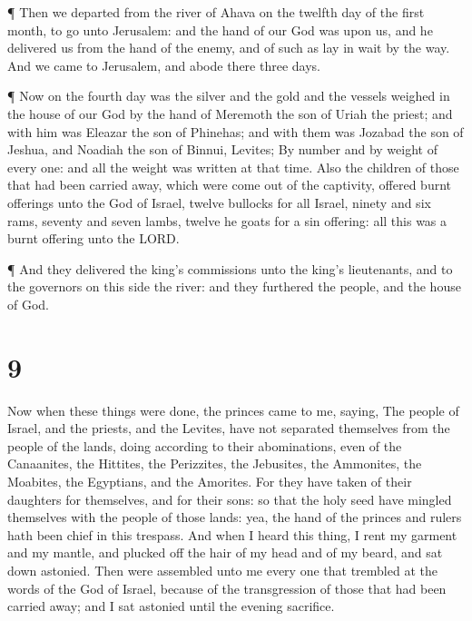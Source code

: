  ¶ Then we departed from the river of Ahava on the twelfth
day of the first month, to go unto Jerusalem: and the hand of our God
was upon us, and he delivered us from the hand of the enemy, and of such
as lay in wait by the way.  And we came to Jerusalem, and
abode there three days.

 ¶ Now on the fourth day was the silver and the gold and
the vessels weighed in the house of our God by the hand of Meremoth the
son of Uriah the priest; and with him was Eleazar the son of Phinehas;
and with them was Jozabad the son of Jeshua, and Noadiah the son of
Binnui, Levites;  By number and by weight of every one: and
all the weight was written at that time.  Also the children
of those that had been carried away, which were come out of the
captivity, offered burnt offerings unto the God of Israel, twelve
bullocks for all Israel, ninety and six rams, seventy and seven lambs,
twelve he goats for a sin offering: all this was a burnt offering unto
the LORD.

 ¶ And they delivered the king's commissions unto the
king's lieutenants, and to the governors on this side the river: and
they furthered the people, and the house of God.

\hypertarget{section-8}{%
\section{9}\label{section-8}}

 Now when these things were done, the princes came to me,
saying, The people of Israel, and the priests, and the Levites, have not
separated themselves from the people of the lands, doing according to
their abominations, even of the Canaanites, the Hittites, the
Perizzites, the Jebusites, the Ammonites, the Moabites, the Egyptians,
and the Amorites.  For they have taken of their daughters
for themselves, and for their sons: so that the holy seed have mingled
themselves with the people of those lands: yea, the hand of the princes
and rulers hath been chief in this trespass.  And when I
heard this thing, I rent my garment and my mantle, and plucked off the
hair of my head and of my beard, and sat down astonied. 
Then were assembled unto me every one that trembled at the words of the
God of Israel, because of the transgression of those that had been
carried away; and I sat astonied until the evening sacrifice.

